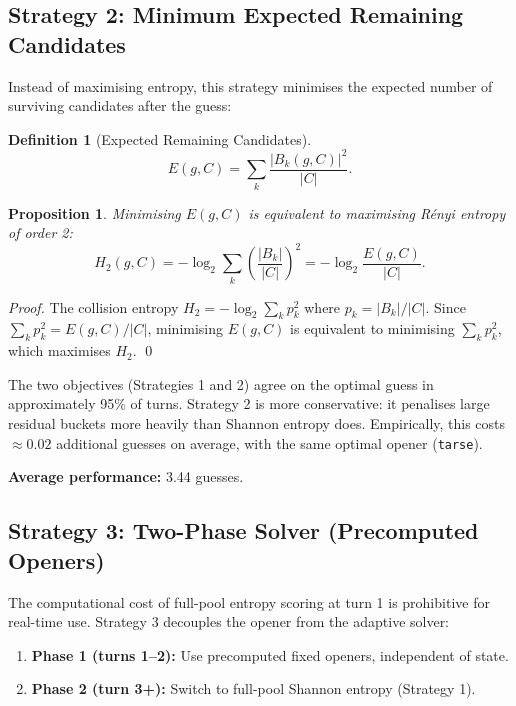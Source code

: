 \documentclass{article}
\newtheorem{proposition}{Proposition}
\newtheorem{definition}{Definition}
\begin{document}
\subsection{Strategy 2: Minimum Expected Remaining Candidates}

Instead of maximising entropy, this strategy minimises the expected number of
surviving candidates after the guess:

\begin{definition}[Expected Remaining Candidates]
  \[
    E(g, C) = \sum_k \frac{|B_k(g,C)|^2}{|C|}.
  \]
\end{definition}

\begin{proposition}
  Minimising $E(g,C)$ is equivalent to maximising Rényi entropy of order 2:
  \[
    H_2(g,C) = -\log_2 \sum_k \left(\frac{|B_k|}{|C|}\right)^2 = -\log_2 \frac{E(g,C)}{|C|}.
  \]
\end{proposition}

\begin{proof}
  The collision entropy $H_2 = -\log_2 \sum_k p_k^2$ where $p_k = |B_k|/|C|$.
  Since $\sum_k p_k^2 = E(g,C)/|C|$, minimising $E(g,C)$ is equivalent to
  minimising $\sum_k p_k^2$, which maximises $H_2$. \qed
\end{proof}

The two objectives (Strategies 1 and 2) agree on the optimal guess in approximately
95\% of turns. Strategy 2 is more conservative: it penalises large residual buckets
more heavily than Shannon entropy does. Empirically, this costs $\approx 0.02$
additional guesses on average, with the same optimal opener (\texttt{tarse}).

\textbf{Average performance:} 3.44 guesses.

\subsection{Strategy 3: Two-Phase Solver (Precomputed Openers)}

The computational cost of full-pool entropy scoring at turn 1 is prohibitive for
real-time use. Strategy 3 decouples the opener from the adaptive solver:

\begin{enumerate}
  \item \textbf{Phase 1 (turns 1--2):} Use precomputed fixed openers, independent of state.
  \item \textbf{Phase 2 (turn 3+):} Switch to full-pool Shannon entropy (Strategy 1).
\end{enumerate}
\end{document}
